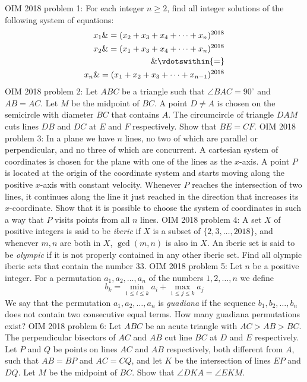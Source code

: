 OIM 2018 problem 1:  For each integer $n \geq 2$, find all integer solutions of the following system of equations:
\begin{align*}
x_1 \&= (x_2 + x_3 + x_4 + \dots + x_n)^{2018} \\
x_2 \&= (x_1 + x_3 + x_4 + \dots + x_n)^{2018} \\
\& \vdotswithin{ = } \\
x_n \&= (x_1 + x_2 + x_3 + \dots + x_{n - 1})^{2018}
\end{align*} 
OIM 2018 problem 2:  Let $ABC$ be a triangle such that $\angle BAC = 90^{\circ}$ and $AB = AC$. Let $M$ be the midpoint of $BC$. A point $D \neq A$ is chosen on the semicircle with diameter $BC$ that contains $A$. The circumcircle of triangle $DAM$ cuts lines $DB$ and $DC$ at $E$ and $F$ respectively. Show that $BE = CF$. 
OIM 2018 problem 3:  In a plane we have $n$ lines, no two of which are parallel or perpendicular, and no three of which are concurrent. A cartesian system of coordinates is chosen for the plane with one of the lines as the $x$-axis. A point $P$ is located at the origin of the coordinate system and starts moving along the positive $x$-axis with constant velocity. Whenever $P$ reaches the intersection of two lines, it continues along the line it just reached in the direction that increases its $x$-coordinate. Show that it is possible to choose the system of coordinates in such a way that $P$ visits points from all $n$ lines. 
OIM 2018 problem 4:  A set $X$ of positive integers is said to be \textit{iberic} if $X$ is a subset of $\{2, 3, \dots, 2018\}$, and whenever $m, n$ are both in $X$, $\gcd(m, n)$ is also in $X$. An iberic set is said to be \textit{olympic} if it is not properly contained in any other iberic set. Find all olympic iberic sets that contain the number $33$. 
OIM 2018 problem 5:  Let $n$ be a positive integer. For a permutation $a_1, a_2, \dots, a_n$ of the numbers $1, 2, \dots, n$ we define
\[ b_k = \min_{1 \leq i \leq k} a_i + \max_{1 \leq j \leq k} a_j \]
We say that the permutation $a_1, a_2, \dots, a_n$ is \textit{guadiana} if the sequence $b_1, b_2, \dots, b_n$ does not contain two consecutive equal terms. How many guadiana permutations exist? 
OIM 2018 problem 6:  Let $ABC$ be an acute triangle with $AC > AB > BC$. The perpendicular bisectors of $AC$ and $AB$ cut line $BC$ at $D$ and $E$ respectively. Let $P$ and $Q$ be points on lines $AC$ and $AB$ respectively, both different from $A$, such that $AB = BP$ and $AC = CQ$, and let $K$ be the intersection of lines $EP$ and $DQ$. Let $M$ be the midpoint of $BC$. Show that $\angle DKA = \angle EKM$. 

